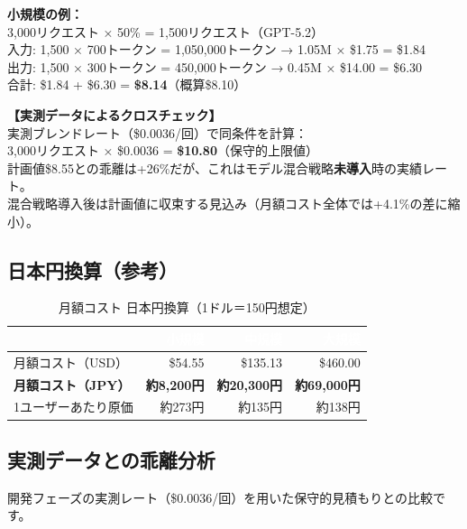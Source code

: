 \documentclass[a4paper,11pt]{ltjsarticle}
\begin{document}
\begin{infobox}
\textbf{小規模の例：}\\
3,000リクエスト × 50\% = 1,500リクエスト（GPT-5.2）\\
入力: 1,500 × 700トークン = 1,050,000トークン → 1.05M × \$1.75 = \$1.84\\
出力: 1,500 × 300トークン = 450,000トークン → 0.45M × \$14.00 = \$6.30\\
合計: \$1.84 + \$6.30 = \textbf{\$8.14}（概算\$8.10）

\vspace{0.5em}
\textbf{【実測データによるクロスチェック】}\\
実測ブレンドレート（\$0.0036/回）で同条件を計算：\\
3,000リクエスト × \$0.0036 = \textbf{\$10.80}（保守的上限値）\\
計画値\$8.55との乖離は+26\%だが、これはモデル混合戦略\textbf{未導入}時の実績レート。\\
混合戦略導入後は計画値に収束する見込み（月額コスト全体では+4.1\%の差に縮小）。
\end{infobox}

\subsection{日本円換算（参考）}

\begin{table}[H]
\centering
\caption{月額コスト 日本円換算（1ドル＝150円想定）}
\begin{tabular}{lrrr}
\toprule
\rowcolor{headerblue}\textcolor{white}{\textbf{}} & \textcolor{white}{\textbf{小規模}} & \textcolor{white}{\textbf{中規模}} & \textcolor{white}{\textbf{大規模}} \\
\midrule
月額コスト（USD） & \$54.55 & \$135.13 & \$460.00 \\
\rowcolor{lightgray}
\textbf{月額コスト（JPY）} & \textbf{約8,200円} & \textbf{約20,300円} & \textbf{約69,000円} \\
1ユーザーあたり原価 & 約273円 & 約135円 & 約138円 \\
\bottomrule
\end{tabular}
\end{table}

\subsection{実測データとの乖離分析}

開発フェーズの実測レート（\$0.0036/回）を用いた保守的見積もりとの比較です。
\end{document}
